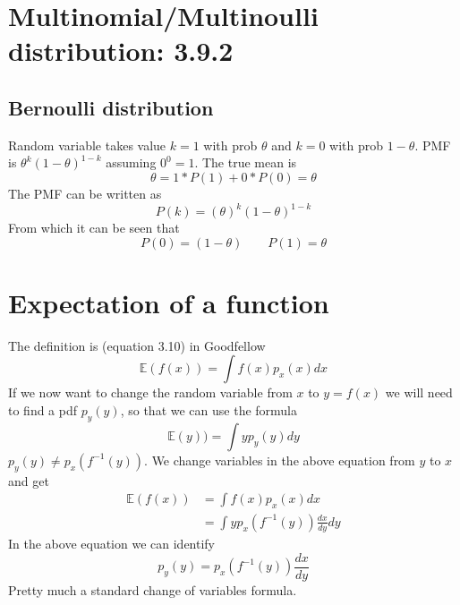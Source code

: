 \documentclass{article}
\newcommand{\beq}{\begin{equation}}
\newcommand{\eeq}{\end{equation}}
\newcommand{\ber}{\begin{eqnarray}}
\newcommand{\eer}{\end{eqnarray}}
\begin{document}
\section{ Multinomial/Multinoulli distribution: 3.9.2 }
\subsection{Bernoulli distribution}
Random variable takes value $k=1$ with prob $\theta$ and $k=0$ with prob $1-\theta$. PMF is $\theta^k(1-\theta)^{1-k}$ assuming $0^0=1$. The true mean is
\beq
\theta = 1*P(1) + 0*P(0) = \theta
\eeq
The PMF can be written as
\beq
P(k) = (\theta)^k(1-\theta)^{1-k}
\eeq
From which it can be seen that
\beq
P(0) = (1-\theta) \qquad P(1) = \theta
\eeq
\section{Expectation of a function}
The definition is (equation 3.10) in Goodfellow
\beq
\mathbb{E}(f(x)) = \int f(x) p_x(x) dx
\eeq
If we now want to change the random variable from $x$ to $y=f(x)$ we will need to find a pdf $p_y(y)$, so that we can use the formula
\beq
\mathbb{E}(y)) = \int yp_y(y)dy 
\eeq
$p_y(y) \ne p_x(f^{-1}(y))$. We change variables in the above equation from $y$ to $x$ and get
\ber
\mathbb{E}(f(x)) &= \int f(x)p_x(x)dx \\
               &= \int y p_x(f^{-1}(y)) \frac{dx}{dy} dy
\eer
In the above equation we can identify
\beq
p_y(y) = p_x(f^{-1}(y)) \frac{dx}{dy} 
\eeq
Pretty much a standard change of variables formula.
%
%
%
\end{document}
